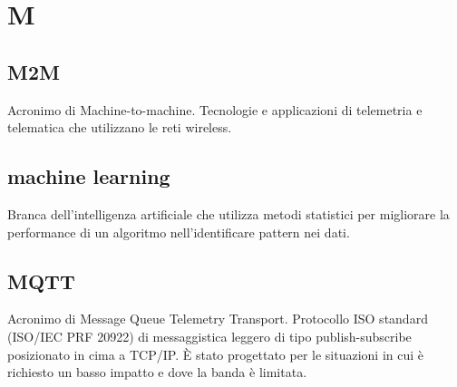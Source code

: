 \section*{M}
\markright{}
\subsection*{M2M}
Acronimo di Machine-to-machine. Tecnologie e applicazioni di telemetria e telematica che utilizzano le reti wireless.
\subsection*{machine learning}
Branca dell'intelligenza artificiale che utilizza metodi statistici per migliorare la performance di un algoritmo nell'identificare pattern nei dati.
\subsection*{MQTT}
Acronimo di Message Queue Telemetry Transport. Protocollo ISO standard (ISO/IEC PRF 20922) di messaggistica leggero di tipo publish-subscribe posizionato in cima a TCP/IP. È stato progettato per le situazioni in cui è richiesto un basso impatto e dove la banda è limitata. 